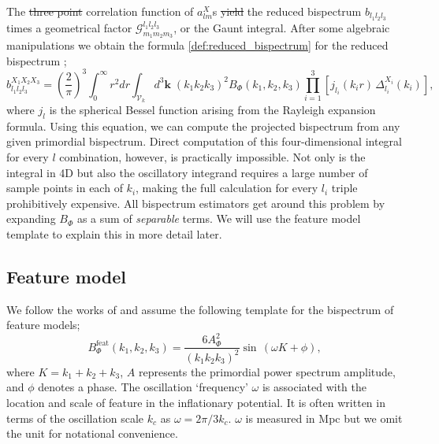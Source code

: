 \documentclass[a4paper,12pt,times,custombib,print,index]{Classes/PhDThesisPSnPDF} %
\providecommand{\DIFadd}[1]{{\protect\color{blue}\uwave{#1}}} %
\providecommand{\DIFdel}[1]{{\protect\color{red}\sout{#1}}}                      %
\providecommand{\DIFaddbegin}{} %
\providecommand{\DIFaddend}{} %
\providecommand{\DIFdelbegin}{} %
\providecommand{\DIFdelend}{} %
\newcommand{\DIFscaledelfig}{0.5}
\newlength{\DIFdelgraphicswidth} %
\newlength{\DIFdelgraphicsheight} %
\newcommand{\DIFaddincludegraphics}[2][]{{\color{blue}\fbox{\DIFOincludegraphics[#1]{#2}}}} %
\newcommand{\DIFdelincludegraphics}[2][]{%
\sbox{\DIFdelgraphicsbox}{\DIFOincludegraphics[#1]{#2}}%
\settoboxwidth{\DIFdelgraphicswidth}{\DIFdelgraphicsbox} %
\settoboxtotalheight{\DIFdelgraphicsheight}{\DIFdelgraphicsbox} %
\scalebox{\DIFscaledelfig}{%
\parbox[b]{\DIFdelgraphicswidth}{\usebox{\DIFdelgraphicsbox}\\[-\baselineskip] \rule{\DIFdelgraphicswidth}{0em}}\llap{\resizebox{\DIFdelgraphicswidth}{\DIFdelgraphicsheight}{%
\setlength{\unitlength}{\DIFdelgraphicswidth}%
\begin{picture}(1,1)%
\thicklines\linethickness{2pt} %
{\color[rgb]{1,0,0}\put(0,0){\framebox(1,1){}}}%
{\color[rgb]{1,0,0}\put(0,0){\line( 1,1){1}}}%
{\color[rgb]{1,0,0}\put(0,1){\line(1,-1){1}}}%
\end{picture}%
}\hspace*{3pt}}} %
} %
\DeclareRobustCommand{\DIFaddbegin}{\DIFOaddbegin \let\includegraphics\DIFaddincludegraphics} %
\DeclareRobustCommand{\DIFaddend}{\DIFOaddend \let\includegraphics\DIFOincludegraphics} %
\DeclareRobustCommand{\DIFdelbegin}{\DIFOdelbegin \let\includegraphics\DIFdelincludegraphics} %
\DeclareRobustCommand{\DIFdelend}{\DIFOaddend \let\includegraphics\DIFOincludegraphics} %
\begin{document}
The \DIFdelbegin \DIFdel{three point }\DIFdelend \DIFaddbegin \DIFadd{three-point }\DIFaddend correlation function of $a_{lm}^X$s \DIFdelbegin \DIFdel{yield }\DIFdelend \DIFaddbegin \DIFadd{yields }\DIFaddend the reduced bispectrum $b_{l_1 l_2 l_3}$ times a geometrical factor $\mathcal{G}^{l_1 l_2 l_3}_{m_1 m_2 m_3}$, or the Gaunt integral. After some algebraic manipulations we obtain the formula \eqref{def:reduced_bispectrum} for the reduced bispectrum ;
\begin{equation}
	b_{l_1 l_2 l_3}^{X_1 X_2 X_3} = \left(\frac{2}{\pi}\right)^3 \int_{0}^{\infty} r^2 dr \int_{\mathcal{V}_k} d^3\textbf{k} \; (k_1 k_2 k_3)^2 B_\Phi (k_1, k_2, k_3) \prod_{i=1}^{3} \left[ j_{l_i}(k_i r) \, \Delta_{l_i}^{X_i}(k_i) \right],
	\label{reduced bispectrum}
\end{equation}
where $j_l$ is the spherical Bessel function arising from the Rayleigh expansion formula. Using this equation, we can compute the projected bispectrum from any given primordial bispectrum. Direct computation of this four-dimensional integral for every $l$ combination, however, is practically impossible. Not only is the integral in 4D but also the oscillatory integrand requires a large number of sample points in each of $k_i$, making the full calculation for every $l_i$ triple prohibitively expensive. All bispectrum estimators get around this problem by expanding $B_\Phi$ as a sum of \textit{separable} terms. We will use the feature model template to explain this in more detail later.

\subsection{Feature model}

We follow the works of \cite{Munchmeyer2014,Fergusson2015a,Fergusson2015b,PlanckCollaboration2015} and assume the following template for the bispectrum of feature models;
\begin{equation}
	B_\Phi ^ {\text{feat}}(k_1, k_2, k_3) = \frac{6 A_\Phi^2}{(k_1 k_2 k_3)^2} \sin\,(\omega K + \phi),
	\label{feature model definition}
\end{equation}
where $K = k_1 + k_2 + k_3$, $A$ represents the primordial power spectrum amplitude, and $\phi$ denotes a phase. The oscillation `frequency' $\omega$ is associated with the location and scale of \DIFaddbegin \DIFadd{the }\DIFaddend feature in the inflationary potential. It is often written in terms of the oscillation scale $k_c$ as $\omega = 2\pi/3k_c$. $\omega$ is measured in Mpc but we omit the unit for notational convenience.
\end{document}
